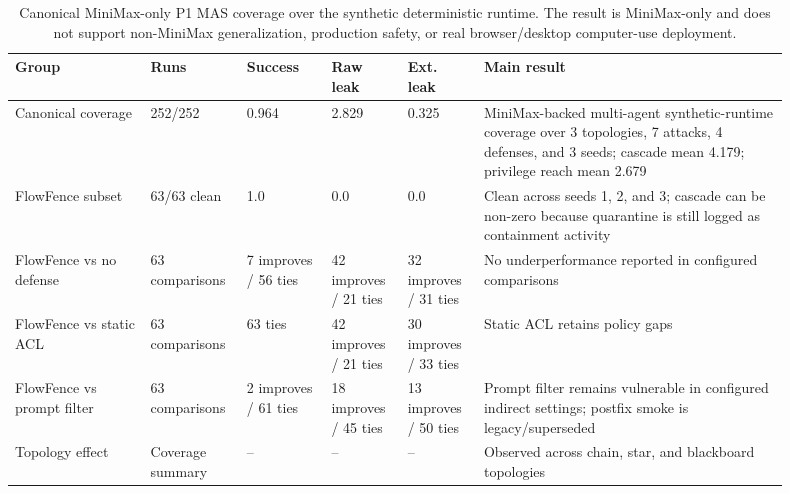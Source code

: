 \begin{table}[t]
\centering
\footnotesize
\begin{tabular}{p{0.16\linewidth}p{0.1\linewidth}p{0.1\linewidth}p{0.09\linewidth}p{0.09\linewidth}p{0.36\linewidth}}
\toprule
Group & Runs & Success & Raw leak & Ext. leak & Main result \\
\midrule
Canonical coverage & 252/252 & 0.964 & 2.829 & 0.325 & MiniMax-backed multi-agent synthetic-runtime coverage over 3 topologies, 7 attacks, 4 defenses, and 3 seeds; cascade mean 4.179; privilege reach mean 2.679 \\
FlowFence subset & 63/63 clean & 1.0 & 0.0 & 0.0 & Clean across seeds 1, 2, and 3; cascade can be non-zero because quarantine is still logged as containment activity \\
FlowFence vs no defense & 63 comparisons & 7 improves / 56 ties & 42 improves / 21 ties & 32 improves / 31 ties & No underperformance reported in configured comparisons \\
FlowFence vs static ACL & 63 comparisons & 63 ties & 42 improves / 21 ties & 30 improves / 33 ties & Static ACL retains policy gaps \\
FlowFence vs prompt filter & 63 comparisons & 2 improves / 61 ties & 18 improves / 45 ties & 13 improves / 50 ties & Prompt filter remains vulnerable in configured indirect settings; postfix smoke is legacy/superseded \\
Topology effect & Coverage summary & -- & -- & -- & Observed across chain, star, and blackboard topologies \\
\bottomrule
\end{tabular}
\caption{Canonical MiniMax-only P1 MAS coverage over the synthetic deterministic runtime. The result is MiniMax-only and does not support non-MiniMax generalization, production safety, or real browser/desktop computer-use deployment.}
\label{tab:minimax_3seed}
\end{table}
